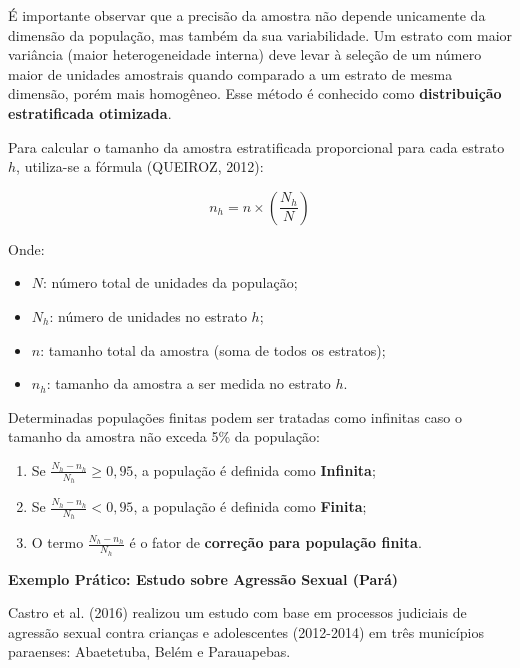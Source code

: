 É importante observar que a precisão da amostra não depende unicamente da dimensão da população, mas também da sua variabilidade. Um estrato com maior variância (maior heterogeneidade interna) deve levar à seleção de um número maior de unidades amostrais quando comparado a um estrato de mesma dimensão, porém mais homogêneo. Esse método é conhecido como \textbf{distribuição estratificada otimizada}.
\vskip0.3cm

Para calcular o tamanho da amostra estratificada proporcional para cada estrato $h$, utiliza-se a fórmula (QUEIROZ, 2012):

\begin{equation}\label{amostestra}
n_{h} = n \times \left( \frac{N_{h}}{N} \right)
\end{equation}

Onde:
\begin{itemize}
    \item $N$: número total de unidades da população;
    \item $N_{h}$: número de unidades no estrato $h$;
    \item $n$: tamanho total da amostra (soma de todos os estratos);
    \item $n_{h}$: tamanho da amostra a ser medida no estrato $h$.
\end{itemize}

Determinadas populações finitas podem ser tratadas como infinitas caso o tamanho da amostra não exceda 5\% da população:
\begin{enumerate}
    \item Se $\frac{N_h - n_h}{N_h} \geq 0,95$, a população é definida como \textbf{Infinita};
    \item Se $\frac{N_h - n_h}{N_h} < 0,95$, a população é definida como \textbf{Finita};
    \item O termo $\frac{N_h - n_h}{N_h}$ é o fator de \textbf{correção para população finita}.
\end{enumerate}
\vskip0.3cm


\newpage
\textbf{Exemplo Prático: Estudo sobre Agressão Sexual (Pará)}
\vskip0.3cm

Castro et al. (2016) realizou um estudo com base em processos judiciais de agressão sexual contra crianças e adolescentes (2012-2014) em três municípios paraenses: Abaetetuba, Belém e Parauapebas. 


